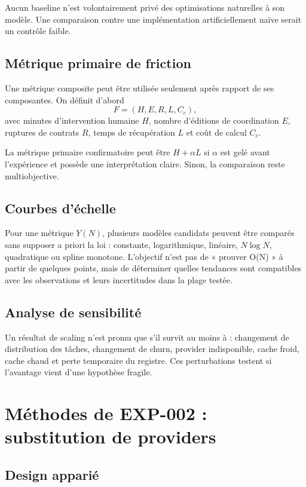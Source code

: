 Aucun baseline n'est volontairement privé des optimisations naturelles à son modèle. Une comparaison contre une implémentation artificiellement naïve serait un contrôle faible.

\section{Métrique primaire de friction}

Une métrique composite peut être utilisée seulement après rapport de ses composantes. On définit d'abord
\[
F=(H,E,R,L,C_c),
\]
avec minutes d'intervention humaine $H$, nombre d'éditions de coordination $E$, ruptures de contrats $R$, temps de récupération $L$ et coût de calcul $C_c$.

La métrique primaire confirmatoire peut être $H+\alpha L$ si $\alpha$ est gelé avant l'expérience et possède une interprétation claire. Sinon, la comparaison reste multiobjective.

\section{Courbes d'échelle}

Pour une métrique $Y(N)$, plusieurs modèles candidats peuvent être comparés sans supposer a priori la loi : constante, logarithmique, linéaire, $N\log N$, quadratique ou spline monotone. L'objectif n'est pas de « prouver O(N) » à partir de quelques points, mais de déterminer quelles tendances sont compatibles avec les observations et leurs incertitudes dans la plage testée.

\section{Analyse de sensibilité}

Un résultat de scaling n'est promu que s'il survit au moins à : changement de distribution des tâches, changement de churn, provider indisponible, cache froid, cache chaud et perte temporaire du registre. Ces perturbations testent si l'avantage vient d'une hypothèse fragile.

\chapter{Méthodes de EXP-002 : substitution de providers}

\section{Design apparié}

